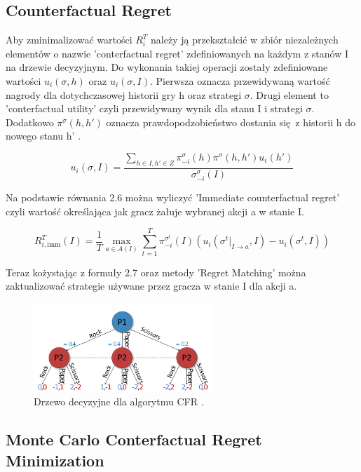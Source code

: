 \documentclass[12pt,oneside,a4paper]{report}
\begin{document}
\subsection{Counterfactual Regret}

Aby zminimalizować wartości $R^{T}_{i}$ należy ją przekształcić w zbiór niezależnych elementów o
nazwie 'conterfactual regret' zdefiniowanych na każdym z stanów I na drzewie decyzyjnym.
Do wykonania takiej operacji zostały zdefiniowane wartości $u_{i}(\sigma, h)$ oraz $u_{i}(\sigma,
I)$. Pierwsza oznacza przewidywaną wartość nagrody dla dotychczasowej historii gry h oraz strategi
$\sigma$. Drugi element to 'conterfactual utility' czyli przewidywany wynik dla stanu I i strategi
$\sigma$. Dodatkowo $\pi^{\sigma} (h, h')$ oznacza prawdopodzobieństwo dostania się z historii h do 
nowego stanu h' \cite{rmg}.

\begin{equation}
   u_{i} (\sigma, I) = \frac{\sum_{h \in I, h' \in Z} \pi^{\sigma}_{-i} (h) \pi^{\sigma} (h, h')
   u_{i}(h')}{\sigma^{\sigma}_{-i}(I)}
\end{equation}

Na podstawie równania 2.6 można wyliczyć 'Immediate counterfactual regret' czyli wartość określająca
jak gracz żałuje wybranej akcji a w stanie I.

\begin{equation}
   R^{T}_{i,\text{imm}} (I) = \frac{1}{T} \max_{a \in A(I)} \sum^{T}_{t=1} \pi^{\sigma^{t}}_{-i} (I)
   (u_{i}(\sigma^{t}|_{I \rightarrow a}, I) - u_{i}(\sigma^{t}, I))
\end{equation}

Teraz kożystając z formuły 2.7 oraz metody 'Regret Matching' można zaktualizować strategie używane przez gracza w
stanie I dla akcji a.


\begin{figure}[h!]
  \centering
  \includegraphics[width=0.6\textwidth]{./img/rsp.png}
  \caption{Drzewo decyzyjne dla algorytmu
  CFR \cite{iig}.}
\end{figure}

\subsection{Monte Carlo Conterfactual Regret Minimization}
\end{document}
